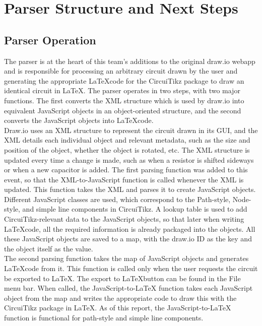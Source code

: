 %
\chapter{Parser Structure and Next Steps}\label{ch:parser-structure}


\section{Parser Operation}\label{sec:parser-ops}
The parser is at the heart of this team's additions to the original draw.io webapp and is responsible for processing an arbitrary circuit drawn by the user and generating the appropriate \LaTeX code for the CircuiTikz package to draw an identical circuit in \LaTeX.
The parser operates in two steps, with two major functions.
The first converts the XML structure which is used by draw.io into equivalent JavaScript objects in an object-oriented structure, and the second converts the JavaScript objects into \LaTeX code.\\

Draw.io uses an XML structure to represent the circuit drawn in its GUI, and the XML details each individual object and relevant metadata, such as the size and position of the object, whether the object is rotated, etc.
The XML structure is updated every time a change is made, such as when a resistor is shifted sideways or when a new capacitor is added.
The first parsing function was added to this event, so that the XML-to-JavaScript function is called whenever the XML is updated.
This function takes the XML and parses it to create JavaScript objects. \\

Different JavaScript classes are used, which correspond to the Path-style, Node-style, and simple line components in CircuiTikz.
A lookup table is used to add CircuiTikz-relevant data to the JavaScript objects, so that later when writing \LaTeX code, all the required information is already packaged into the objects.
All these JavaScript objects are saved to a map, with the draw.io ID as the key and the object itself as the value.\\

The second parsing function takes the map of JavaScript objects and generates \LaTeX code from it.
This function is called only when the user requests the circuit be exported to \LaTeX.
The export to \LaTeX button can be found in the File menu bar.
When called, the JavaScript-to-LaTeX function takes each JavaScript object from the map and writes the appropriate code to draw this with the CircuiTikz package in \LaTeX.
As of this report, the JavaScript-to-LaTeX function is functional for path-style and simple line components.



